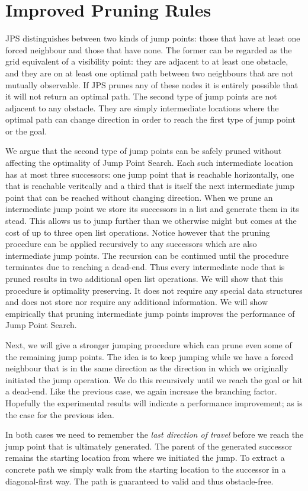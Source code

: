 \section{Improved Pruning Rules}
\label{sec::pruning}
JPS distinguishes between two kinds of jump points: those that have at least
one forced neighbour and those that have none. The former can be regarded as
the grid equivalent of a visibility point: they are adjacent to at least one
obstacle, and they are on at least one optimal path between two neighbours
that are not mutually observable. If JPS prunes any of these nodes it is
entirely possible that it will not return an optimal path.
The second type of jump points are not adjacent to any obstacle. They are
simply intermediate locations where the optimal path can change direction in 
order to reach the first type of jump point or the goal. 
\par
We argue that the second type of jump points can be safely pruned without 
affecting the optimality of Jump Point Search.
Each such intermediate location has at most three successors:
one jump point that is reachable horizontally, one that is reachable veritcally and a third that is 
itself the next intermediate jump point that can be reached without changing direction.
When we prune an intermediate jump point we store its successors in a list and
generate them in its stead. This allows us to jump further than we otherwise might but
comes at the cost of up to three open list operations. Notice however that the pruning
procedure can be applied recursively to any successors which are also intermediate
jump points. The recursion can be continued until the procedure terminates due to 
reaching a dead-end. Thus every intermediate node that is pruned results in two additional
open list operations. 
We will show that this procedure is optimality preserving. It does not require any special
data structures and does not store nor require any additional information. We will show
empirically that pruning intermediate jump points improves the performance of Jump Point
Search.
\par
Next, we will give a stronger jumping procedure which can prune even some of the
remaining jump points. The idea is to keep jumping while we have a forced neighbour
that is in the same direction as the direction in which we originally initiated
the jump operation. We do this recursively until we reach the goal or hit a
dead-end. Like the previous case, we again increase the branching factor. Hopefully
the experimental results will indicate a performance improvement; as is the case for
the previous idea.
\par
In both cases we need to remember the \emph{last direction of travel} before we reach
the jump point that is ultimately generated. The parent of the generated successor remains 
the starting location from where we initiated the jump. To extract a concrete path we 
simply walk from the starting location to the successor in a diagonal-first way.
The path is guaranteed to valid and thus obstacle-free.
